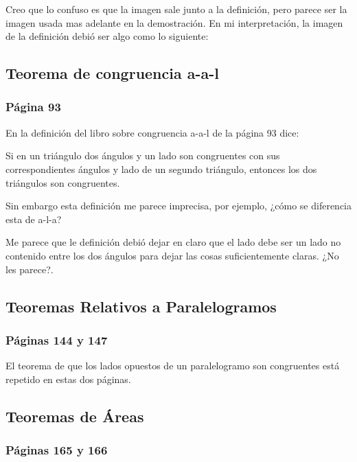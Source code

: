 Creo que lo confuso es que la imagen sale junto a la definición, pero parece ser la imagen usada mas adelante en la demostración. En mi interpretación, la imagen de la definición debió ser algo como lo siguiente:

\begin{figure}[!h]
    \centering
    
    \label{fig:interior-exterior-angles}
\end{figure}

\subsection{Teorema de congruencia a-a-l}
\subsubsection{Página 93}

En la definición del libro sobre congruencia a-a-l de la página 93 dice:

Si en un triángulo dos ángulos y un lado son congruentes con sus correspondientes ángulos y lado de un segundo triángulo, entonces los dos triángulos son congruentes.

Sin embargo esta definición me parece imprecisa, por ejemplo, ¿cómo se diferencia esta de a-l-a?

Me parece que le definición debió dejar en claro que el lado debe ser un lado no contenido entre los dos ángulos para dejar las cosas suficientemente claras. ¿No les parece?.

\subsection{Teoremas Relativos a Paralelogramos}
\subsubsection{Páginas 144 y 147}

El teorema de que los lados opuestos de un paralelogramo son congruentes está repetido en estas dos páginas.

\subsection{Teoremas de Áreas}
\subsubsection{Páginas 165 y 166}

